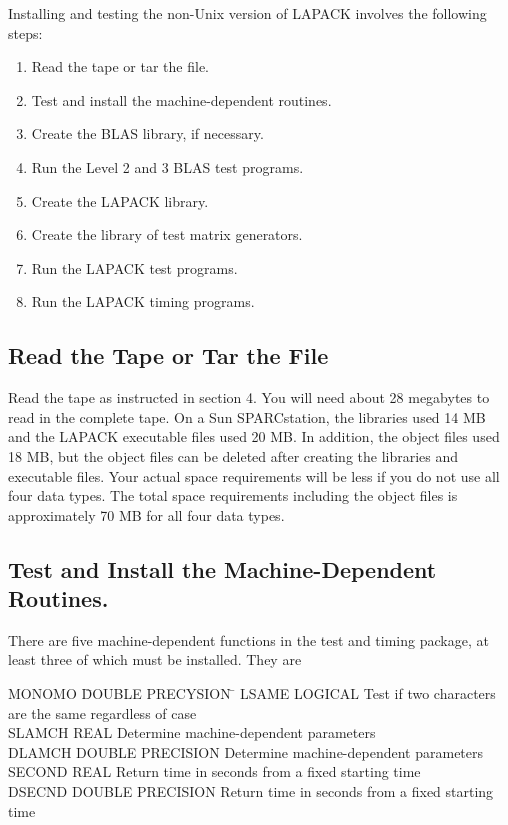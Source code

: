 \noindent
Installing and testing the non-Unix version of LAPACK
involves the following steps: 
\begin{enumerate}
\item Read the tape or tar the file.

\item Test and install the machine-dependent routines.

\item Create the BLAS library, if necessary. 

\item Run the Level 2 and 3 BLAS test programs.

\item Create the LAPACK library.

\item Create the library of test matrix generators.

\item Run the LAPACK test programs.

\item Run the LAPACK timing programs.

\end{enumerate}

\subsection{Read the Tape or Tar the File}
\dent
Read the tape as instructed in section 4.
You will need about 28 megabytes to read in the complete tape.
On a Sun SPARCstation, the libraries used 14 MB and the
LAPACK executable files used 20 MB. 
In addition, the object files used
18 MB, but the object files can be deleted after creating
the libraries and executable files.
Your actual space requirements will be less if you do not
use all four data types.  The total space requirements
including the object files is approximately 70 MB for all four
data types.

\subsection{Test and Install the Machine-Dependent Routines.}
\dent
There are five machine-dependent functions in the test and timing
package, at least three of which must be installed.  They are

\begin{tabbing}
MONOMO  \=  DOUBLE PRECYSION  \=  \kill
LSAME   \>  LOGICAL      \> Test if two characters are the same regardless of case \\
SLAMCH  \>  REAL  \> Determine machine-dependent parameters \\
DLAMCH  \>  DOUBLE PRECISION \> Determine machine-dependent parameters \\
SECOND  \>  REAL  \> Return time in seconds from a fixed starting time \\
DSECND  \>  DOUBLE PRECISION  \> Return time in seconds from a fixed starting time
\end{tabbing}

